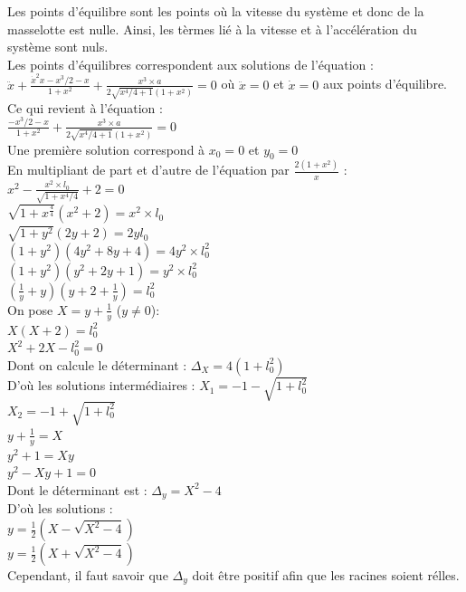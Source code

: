 \documentclass[10pt,a4paper]{article}
\begin{document}
Les points d'équilibre sont les points où la vitesse du système et donc de la masselotte est nulle. Ainsi, les tèrmes lié à la vitesse et à l'accélération du système sont nuls.\\
Les points d'équilibres correspondent aux solutions de l'équation :\\
$ \ddot{x}+\frac{\dot{x}^2x-x^3/2-x}{1+x^2}+\frac{x^3\times a}{2\sqrt{x^4/4+1}(1+x^2)}=0 $
où 
$\ddot{x}=0$ et $\dot{x}=0$ aux points d'équilibre.\\
Ce qui revient à l'équation :\\
$\frac{-x^3/2-x}{1+x^2} + \frac{x^3\times a}{2\sqrt{x^4/4+1}(1+x^2)}=0$ \\
Une première solution correspond à $x_0=0$ et $y_0=0$ \\
En multipliant de part et d'autre de l'équation par $\frac{2(1+x^2)}{x}$ :\\
$x^2-\frac{x^2\times l_0}{\sqrt{1+x^4/4}}+2=0$\\
$\sqrt{1+x^\frac{4}{4}}(x^2+2)=x^2\times l_0$\\
$\sqrt{1+y^2}(2y+2)=2yl_0$\\
$(1+y^2)(4y^2+8y+4)=4y^2\times l_0^2$\\
$(1+y^2)(y^2+2y+1)=y^2\times l_0^2$\\
$(\frac{1}{y}+y)(y+2+\frac{1}{y})=l_0^2$\\
On pose $X=y+\frac{1}{y}$ ($y\neq 0$):\\
$X(X+2)=l_0^2$\\
$X^2+2X-l_0^2=0$\\
Dont on calcule le déterminant :
$\Delta_X=4(1+l_0^2)$\\
D'où les solutions intermédiaires :
$X_1=-1-\sqrt{1+l_0^2}$\\
$X_2=-1+\sqrt{1+l_0^2}$\\
$y+\frac{1}{y}=X$\\
$y^2+1=Xy$\\
$y^2-Xy+1=0$\\
Dont le déterminant est :
$\Delta_y=X^2-4$\\
D'où les solutions :\\
$y=\frac{1}{2}(X-\sqrt{X^2-4})$\\
$y=\frac{1}{2}(X+\sqrt{X^2-4})$\\
Cependant, il faut savoir que $\Delta_y$ doit être positif afin que les racines soient rélles.\\

\renewcommand{\labelitemi}{$\circ$}
\end{document}
